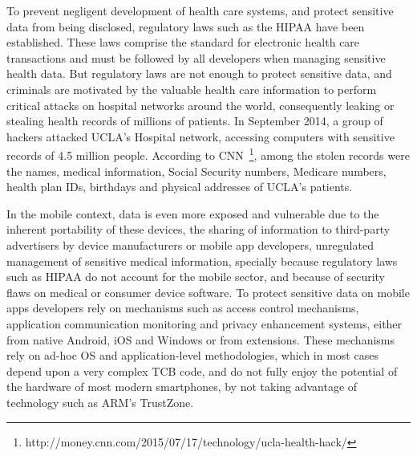 To prevent negligent development of health care systems, and protect sensitive data from being disclosed, regulatory laws such as the \ac{HIPAA} have been established. These laws comprise the standard for electronic health care transactions and must be followed by all developers when managing sensitive health data. But regulatory laws are not enough to protect sensitive data, and criminals are motivated by the valuable health care information to perform critical attacks on hospital networks around the world, consequently leaking or stealing health records of millions of patients. In September 2014, a group of hackers attacked UCLA's Hospital network, accessing computers with sensitive records of 4.5 million people. According to \ac{CNN}~\footnote{http://money.cnn.com/2015/07/17/technology/ucla-health-hack/}, among the stolen records were the names, medical information, Social Security numbers, Medicare numbers, health plan IDs, birthdays and physical addresses of UCLA's patients.

In the mobile context, data is even more exposed and vulnerable due to the inherent portability of these devices, the sharing of information to third-party advertisers by device manufacturers or mobile app developers, unregulated management of sensitive medical information, specially because regulatory laws such as \ac{HIPAA} do not account for the mobile sector, and because of security flaws on medical or consumer device software.
To protect sensitive data on mobile apps developers rely on mechanisms such as access control mechanisms, application communication monitoring and privacy enhancement systems, either from native Android, iOS and Windows or from extensions. These mechanisms rely on ad-hoc \ac{OS} and application-level methodologies, which in most cases depend upon a very complex \ac{TCB} code, and do not fully enjoy the potential of the hardware of most modern smartphones, by not taking advantage of technology such as ARM's TrustZone.


